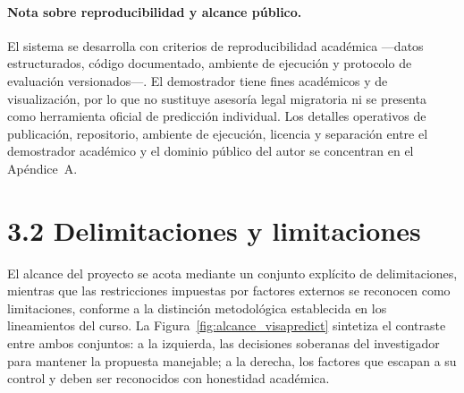 \documentclass[12pt,letterpaper]{report}
\begin{document}
\paragraph{Nota sobre reproducibilidad y alcance público.} El sistema se desarrolla con criterios de reproducibilidad académica ---datos estructurados, código documentado, ambiente de ejecución y protocolo de evaluación versionados---. El demostrador tiene fines académicos y de visualización, por lo que no sustituye asesoría legal migratoria ni se presenta como herramienta oficial de predicción individual. Los detalles operativos de publicación, repositorio, ambiente de ejecución, licencia y separación entre el demostrador académico y el dominio público del autor se concentran en el Apéndice~A.

\section{3.2 Delimitaciones y limitaciones}

El alcance del proyecto se acota mediante un conjunto explícito de delimitaciones, mientras que las restricciones impuestas por factores externos se reconocen como limitaciones, conforme a la distinción metodológica establecida en los lineamientos del curso. La Figura~\ref{fig:alcance_visapredict} sintetiza el contraste entre ambos conjuntos: a la izquierda, las decisiones soberanas del investigador para mantener la propuesta manejable; a la derecha, los factores que escapan a su control y deben ser reconocidos con honestidad académica.
\end{document}
